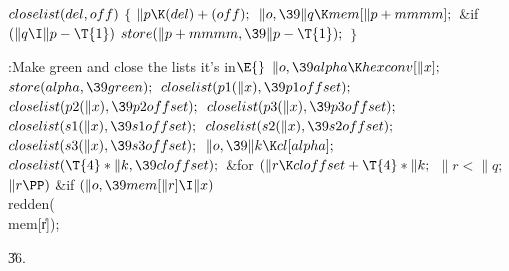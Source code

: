 \B\D$\\{closelist}(\\{del},\\{off})$ \6
${}\{{}$\1\6
${}\|p\K(\\{del})+(\\{off});{}$\6
${}\|o,\39\|q\K\\{mem}[\|p+\\{mmmm}];{}$\6
\&{if} ${}(\|q\I\|p-\T{1}){}$\1\5
${}\\{store}(\|p+\\{mmmm},\39\|p-\T{1});{}$\2\6
\4${}\}{}$\2\par
\Y\B\4:Make  green and close the lists it's in\X${}\E{}$\6
$\|o,\39\\{alpha}\K\\{hexconv}[\|x];{}$\6
${}\\{store}(\\{alpha},\39\\{green});{}$\6
${}\\{closelist}(\\{p1}(\|x),\39\\{p1offset});{}$\6
${}\\{closelist}(\\{p2}(\|x),\39\\{p2offset});{}$\6
${}\\{closelist}(\\{p3}(\|x),\39\\{p3offset});{}$\6
${}\\{closelist}(\\{s1}(\|x),\39\\{s1offset});{}$\6
${}\\{closelist}(\\{s2}(\|x),\39\\{s2offset});{}$\6
${}\\{closelist}(\\{s3}(\|x),\39\\{s3offset});{}$\6
${}\|o,\39\|k\K\\{cl}[\\{alpha}];{}$\6
${}\\{closelist}(\T{4}*\|k,\39\\{cloffset});{}$\6
\&{for} ${}(\|r\K\\{cloffset}+\T{4}*\|k;{}$ ${}\|r<\|q;{}$ ${}\|r\PP){}$\1\6
\&{if} ${}(\|o,\39\\{mem}[\|r]\I\|x){}$\1\5
\\{redden}(\\{mem}[\|r]);\2\2\par
\U36.\fi

